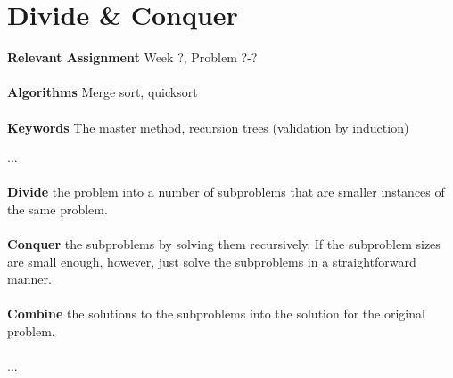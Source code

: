 
\chapter{Divide \& Conquer}
\label{ch:divideandconquer}

\textbf{Relevant Assignment} Week ?, Problem ?-?\\\\
\textbf{Algorithms} Merge sort, quicksort\\\\
\textbf{Keywords} The master method, recursion trees (validation by induction)
\vspace{1in}

\noindent ...
\\\\
\noindent \textbf{Divide} the problem into a number of subproblems that are
smaller instances of the same problem.
\\\\
\noindent \textbf{Conquer} the subproblems by solving them recursively. If the
subproblem sizes are small enough, however, just solve the subproblems in a
straightforward manner.
\\\\
\noindent \textbf{Combine} the solutions to the subproblems into the solution
for the original problem.
\\\\
...

